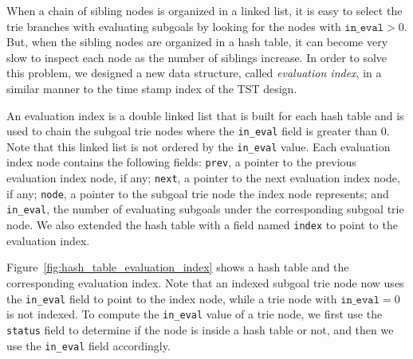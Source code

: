When a chain of sibling nodes is organized in a linked list, it is
easy to select the trie branches with evaluating subgoals by looking
for the nodes with $\texttt{in\_eval} > 0$. But, when the sibling nodes are
organized in a hash table, it can become very slow to inspect each
node as the number of siblings increase. In order to solve this
problem, we designed a new data structure, called \textit{evaluation
index}, in a similar manner to the time stamp index of the TST design.

An evaluation index is a double linked list that is built for each
hash table and is used to chain the subgoal trie nodes where the
\texttt{in\_eval} field is greater than 0. Note that this linked list is not
ordered by the \texttt{in\_eval} value. Each evaluation index node contains
the following fields: \texttt{prev}, a pointer to the previous evaluation
index node, if any; \texttt{next}, a pointer to the next evaluation index
node, if any; \texttt{node}, a pointer to the subgoal trie node the index
node represents; and \texttt{in\_eval}, the number of evaluating subgoals
under the corresponding subgoal trie node. We also extended the hash
table with a field named \texttt{index} to point to the evaluation index.

Figure~\ref{fig:hash_table_evaluation_index} shows a hash table and
the corresponding evaluation index. Note that an indexed subgoal trie
node now uses the \texttt{in\_eval} field to point to the index node, while a
trie node with $\texttt{in\_eval} = 0$ is not indexed. To compute the
\texttt{in\_eval} value of a trie node, we first use the \texttt{status} field to
determine if the node is inside a hash table or not, and then we use the
\texttt{in\_eval} field accordingly.

